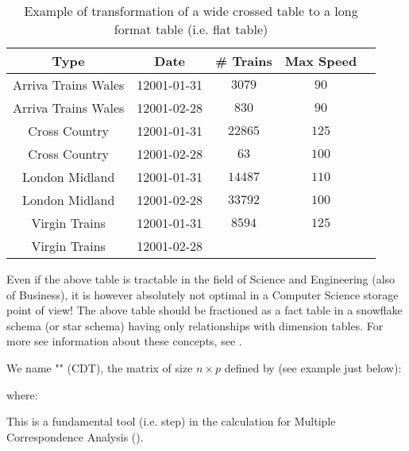	\begin{table}[H]
		\centering
		\begin{tabular}{|c|c|c|c|c|}
			\hline
			\multicolumn{1}{c}{\cellcolor[gray]{0.75}\textbf{Type}} & 
  \multicolumn{1}{c}{\cellcolor[gray]{0.75}\textbf{Date}} & 
  \multicolumn{1}{c}{\cellcolor[gray]{0.75}\textbf{\# Trains}} & 
  \multicolumn{1}{c}{\cellcolor[gray]{0.75}\textbf{Max Speed}} \\ \hline
			 Arriva Trains Wales & 12001-01-31 & $3079$ & $90$ \\ \hline
			 Arriva Trains Wales & 12001-02-28 & $830$ & $90$ \\ \hline
			 Cross Country & 12001-01-31 & $22865$ & $125$ \\ \hline
			 Cross Country & 12001-02-28 & $63$ & $100$ \\ \hline
			 London Midland & 12001-01-31 & $14487$ & $110$ \\ \hline
			 London Midland & 12001-02-28 & $33792$ & $100$ \\ \hline
			 Virgin Trains & 12001-01-31 & $8594$ & $125$ \\ \hline
			 Virgin Trains & 12001-02-28 &  & \ \\ \hline
		\end{tabular}
		\caption{Example of transformation of a wide crossed table to a long format table (i.e. flat table)}
	\end{table}
	\begin{tcolorbox}[title=Remark,arc=10pt,breakable,drop lifted shadow,
  skin=enhanced,
  skin first is subskin of={enhancedfirst}{arc=10pt,no shadow},
  skin middle is subskin of={enhancedmiddle}{arc=10pt,no shadow},
  skin last is subskin of={enhancedlast}{drop lifted shadow}]
	Even if the above table is tractable in the field of Science and Engineering (also of Business), it is however absolutely not optimal in a Computer Science storage point of view! The above table should be fractioned as a fact table in a snowflake schema (or star schema) having only relationships with dimension tables. For more see information about these concepts, see \cite{date2019database}.
	\end{tcolorbox}
	
	We name "" (CDT), the matrix of size $n \times p$ defined by (see example just below):
	
 	where:
 	
	This is a fundamental tool (i.e. step) in the calculation for Multiple Correspondence Analysis ().
	
